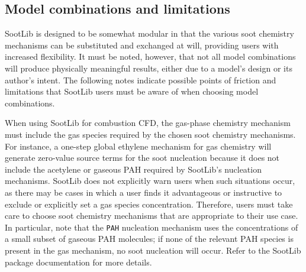 \documentclass[preprint,letterpaper]{elsarticle}
\begin{document}
\subsection{Model combinations and limitations}
\label{s:limitations}

SootLib is designed to be somewhat modular in that the various soot chemistry mechanisms can be substituted and exchanged at will, providing users with increased flexibility. It must be noted, however, that not all model combinations will produce physically meaningful results, either due to a model's design or its author's intent. The following notes indicate possible points of friction and limitations that SootLib users must be aware of when choosing model combinations.

When using SootLib for combustion CFD, the gas-phase chemistry mechanism must include the gas species required by the chosen soot chemistry mechanisms. For instance, a one-step global ethylene mechanism for gas chemistry will generate zero-value source terms for the soot nucleation because it does not include the acetylene or gaseous PAH required by SootLib's nucleation mechanisms. SootLib does not explicitly warn users when such situations occur, as there may be cases in which a user finds it advantageous or instructive to exclude or explicitly set a gas species concentration. Therefore, users must take care to choose soot chemistry mechanisms that are appropriate to their use case. In particular, note that the \texttt{PAH} nucleation mechanism uses the concentrations of a small subset of gaseous PAH molecules; if none of the relevant PAH species is present in the gas mechanism, no soot nucleation will occur. Refer to the SootLib package documentation for more details.
\end{document}
